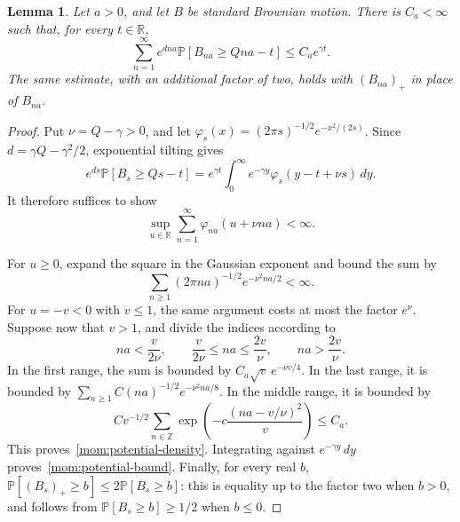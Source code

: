 \documentclass[11pt,letterpaper]{article}
\newcommand{\R}{\mathbb R}
\renewcommand{\P}{\mathbb P}
\newtheorem{lemma}[theorem]{Lemma}
\theoremstyle{definition}
\theoremstyle{remark}
\numberwithin{equation}{section}
\begin{document}
\begin{lemma}\label{mom:potential}
Let $a>0$, and let $B$ be standard Brownian motion.  There is $C_a<\infty$ such that, for every $t\in\R$,
\begin{equation}\label{mom:potential-bound}
 \sum_{n=1}^{\infty}e^{dna}
   \P[B_{na}\ge Qna-t]
 \le C_a e^{\gamma t}.
\end{equation}
The same estimate, with an additional factor of two, holds with $(B_{na})_+$ in place of $B_{na}$.
\end{lemma}

\begin{proof}
Put $\nu=Q-\gamma>0$, and let $\varphi_s(x)=(2\pi s)^{-1/2}e^{-x^2/(2s)}$. Since $d=\gamma Q-\gamma^2/2$, exponential tilting gives
\begin{equation*}
 e^{ds}\P[B_s\ge Qs-t]
 =e^{\gamma t}\int_0^\infty
       e^{-\gamma y}\varphi_s(y-t+\nu s)\,dy.
 \end{equation*}
It therefore suffices to show
\begin{equation}\label{mom:potential-density}
 \sup_{u\in\R}\sum_{n=1}^{\infty}
       \varphi_{na}(u+\nu na)<\infty.
\end{equation}

For $u\ge0$, expand the square in the Gaussian exponent and bound the sum by
\begin{equation*}
 \sum_{n\ge1}(2\pi na)^{-1/2}e^{-\nu^2na/2}<\infty.
\end{equation*}
For $u=-v<0$ with $v\le1$, the same argument costs at most the factor $e^\nu$.  Suppose now that $v>1$, and divide the indices according to
\begin{equation*}
 na<\frac{v}{2\nu},\qquad
 \frac{v}{2\nu}\le na\le\frac{2v}{\nu},\qquad
 na>\frac{2v}{\nu}.
\end{equation*}
In the first range, the sum is bounded by $C_a\sqrt v\,e^{-\nu v/4}$. In the last range, it is bounded by $\sum_{n\ge1}C(na)^{-1/2}e^{-\nu^2na/8}$. In the middle range, it is bounded by
\begin{equation*}
 C v^{-1/2}\sum_{n\in\mathbb Z}
       \exp\!\left(-c\frac{(na-v/\nu)^2}{v}\right)
 \le C_a.
 \end{equation*}
This proves~\eqref{mom:potential-density}.  Integrating against $e^{-\gamma y}\,dy$ proves~\eqref{mom:potential-bound}. Finally, for every real $b$, $\P[(B_s)_+\ge b]\le2\P[B_s\ge b]$: this is equality up to the factor two when $b>0$, and follows from $\P[B_s\ge b]\ge1/2$ when $b\le0$.
\end{proof}
\end{document}
